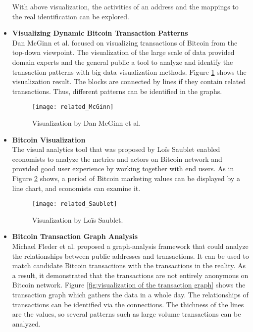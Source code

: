 \begin{itemize}
        With above visualization, the activities of an address and the mappings to the real identification can be explored.
        \clearpage
    \item \textbf{Visualizing Dynamic Bitcoin Transaction Patterns} \cite{McGinn2016} \\
        Dan McGinn et al. focused on visualizing transactions of Bitcoin from the top-down viewpoint. The visualization of the large scale of data provided domain experts and the general public a tool to analyze and identify the transaction patterns with big data visualization methods. Figure \ref{fig:visualization by dan mcGinn et al} \cite{McGinn2016} shows the visualization result. The blocks are connected by lines if they contain related transactions. Thus, different patterns can be identified in the graphs.
        \begin{figure}[htb]
            \centering
            \texttt{[image: related\_McGinn]}
            \caption{Visualization by Dan McGinn et al.}
            \label{fig:visualization by dan mcGinn et al}
        \end{figure}
    \item \textbf{Bitcoin Visualization} \cite{Saublet2015} \\
        The visual analytics tool that was proposed by Loïs Saublet enabled economists to analyze the metrics and actors on Bitcoin network and provided good user experience by working together with end users. As in Figure \ref{fig:visualization by loïs saublet} \cite{Saublet2015} shows, a period of Bitcoin marketing values can be displayed by a line chart, and economists can examine it.
        \begin{figure}[htb]
            \centering
            \texttt{[image: related\_Saublet]}
            \caption{Visualization by Loïs Saublet.}
            \label{fig:visualization by loïs saublet}
        \end{figure}
    \item \textbf{Bitcoin Transaction Graph Analysis} \cite{Fleder2015} \\
        Michael Fleder et al. proposed a graph-analysis framework that could analyze the relationships between public addresses and transactions. It can be used to match candidate Bitcoin transactions with the transactions in the reality. As a result, it demonstrated that the transactions are not entirely anonymous on Bitcoin network. Figure \ref{fig:visualization of the transaction graph} \cite{Fleder2015} shows the transaction graph which gathers the data in a whole day. The relationships of transactions can be identified via the connections. The thichness of the lines are the values, so several patterns such as large volume transactions can be analyzed.

\end{itemize}
